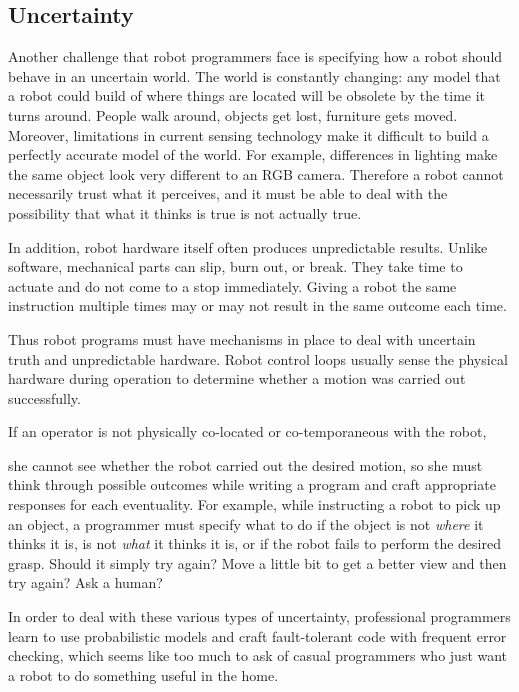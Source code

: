 \documentclass[10pt,twocolumn]{article}
\begin{document}
\subsection{Uncertainty}


Another challenge that robot programmers face is specifying how a robot should behave in an uncertain world. The world is constantly changing: any model that a robot could build of where things are located will be obsolete by the time it turns around. People walk around, objects get lost, furniture gets moved. Moreover, limitations in current sensing technology make it difficult to build a perfectly accurate model of the world. For example, differences in lighting make the same object look very different to an RGB camera. Therefore a robot cannot necessarily trust what it perceives, and it must be able to deal with the possibility that what it thinks is true is not actually true.

In addition, robot hardware itself often produces unpredictable results. Unlike software, mechanical parts can slip, burn out, or break. They take time to actuate and do not come to a stop immediately. Giving a robot the same instruction multiple times may or may not result in the same outcome each time.

Thus robot programs must have mechanisms in place to deal with uncertain truth and unpredictable hardware. Robot control loops usually sense the physical hardware during operation to determine whether a motion was carried out successfully.
\begin{changebar}
If an operator is not physically co-located or co-temporaneous with the robot,
\end{changebar}
she cannot see whether the robot carried out the desired motion, so she must think through possible outcomes while writing a program and craft appropriate responses for each eventuality. For example, while instructing a robot to pick up an object, a programmer must specify what to do if the object is not {\em where} it thinks it is, is not {\em what} it thinks it is, or if the robot fails to perform the desired grasp. Should it simply try again? Move a little bit to get a better view and then try again? Ask a human?

\begin{changebar}
In order to deal with these various types of uncertainty, professional programmers learn to use probabilistic models and craft fault-tolerant code with frequent error checking, which seems like too much to ask of casual programmers who just want a robot to do something useful in the home.
\end{changebar}
\end{document}
